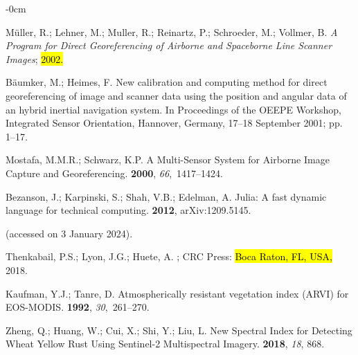 \documentclass[remotesensing,article,accept,pdftex,moreauthors]{Definitions/mdpi}
\begin{document}
\begin{adjustwidth}{-\extralength}{0cm}
\begin{thebibliography}{999}
M{\"u}ller, R.; Lehner, M.; Muller, R.; Reinartz, P.; Schroeder, M.; Vollmer,
  B.
\newblock \emph{A Program for Direct Georeferencing of Airborne and Spaceborne Line
  Scanner Images};
\newblock  \hl{2002.} %


B{\"a}umker, M.; Heimes, F.
\newblock New calibration and computing method for direct georeferencing of
  image and scanner data using the position and angular data of an hybrid
  inertial navigation system.
\newblock In Proceedings of the OEEPE Workshop, Integrated Sensor Orientation, Hannover, Germany,
 17--18 September  2001; pp. 1--17.

Mostafa, M.M.R.; Schwarz, K.P.
\newblock A Multi-Sensor System for Airborne Image Capture and Georeferencing.
 {\bf 2000}, {\em
  66},~1417--1424.

Bezanson, J.; Karpinski, S.; Shah, V.B.; Edelman, A.
\newblock Julia: A fast dynamic language for technical computing.
 {\bf 2012}, arXiv:1209.5145.

 (accessed on 3 January 2024).

Thenkabail, P.S.; Lyon, J.G.; Huete, A.
; CRC Press:  \hl{Boca Raton, FL, USA,} %
 2018.

Kaufman, Y.J.; Tanre, D.
\newblock Atmospherically resistant vegetation index (ARVI) for EOS-MODIS.
 {\bf 1992},
  {\em 30},~261--270.

Zheng, Q.; Huang, W.; Cui, X.; Shi, Y.; Liu, L.
\newblock New Spectral Index for Detecting Wheat Yellow Rust Using Sentinel-2
  Multispectral Imagery.
 {\bf 2018}, {\em 18}, 868.


\end{thebibliography}
\end{adjustwidth}
\end{document}
